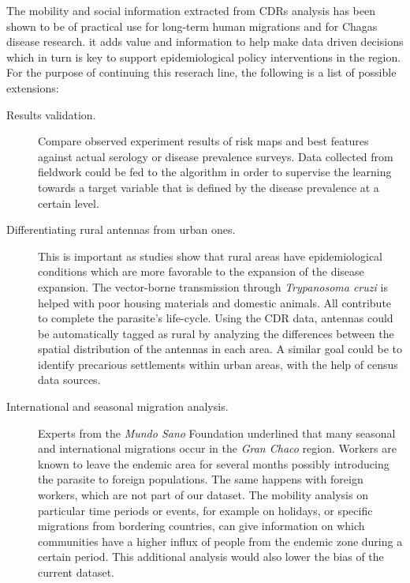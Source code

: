 
The mobility and social information extracted from CDRs analysis has been shown to be of practical use for long-term human migrations and for Chagas disease research.
it adds value and information to help make data driven decisions which in turn is key to support epidemiological policy interventions in the region.
For the purpose of continuing this reserach line, the following is a list of possible extensions:


\begin{description}
    \item [Results validation.] Compare observed experiment results of risk maps and best features against actual serology or disease prevalence surveys.
    Data collected from fieldwork could be fed to the algorithm in order to supervise the learning towards a target variable that is defined by the disease prevalence at a certain level.


    \item [Differentiating rural antennas from urban ones.] This is important as studies show that rural areas have epidemiological conditions which are more favorable to the expansion of the disease expansion.
    The vector-borne transmission through \textit{Trypanosoma cruzi} is helped with poor housing materials and domestic animals.
    All  contribute to complete the parasite's life-cycle.
    Using the CDR data, antennas could be automatically tagged as rural by analyzing the differences between the spatial distribution of the antennas in each area.
    A similar goal could be to identify precarious settlements within urban areas, with the help of census data sources.

    \item [International and seasonal migration analysis.] Experts from the \textit{Mundo Sano} Foundation underlined that many seasonal and international migrations occur in the \textit{Gran Chaco} region.
    Workers are known to leave the endemic area for several months possibly introducing the parasite to foreign populations.
    The same happens with foreign workers, which are not part of our dataset.
    The mobility analysis on particular time periods or events, for example on holidays, or specific migrations from bordering countries, can give information on which communities have a higher influx of people from the endemic zone during a certain period.
    This additional analysis would also lower the bias of the current dataset.



\end{description}
